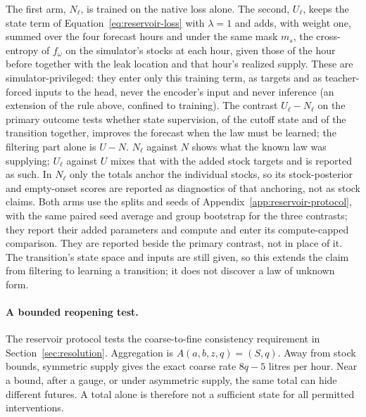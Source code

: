 \documentclass[10pt]{article}
\begin{document}
The first arm, $N_\ell$, is trained on the native loss alone. The second, $U_\ell$,
keeps the state term of Equation~\ref{eq:reservoir-loss} with $\lambda=1$ and adds,
with weight one, summed over the four forecast hours and under the same mask $m_s$,
the cross-entropy of $f_\omega$ on the simulator's stocks at each hour, given those of
the hour before together with the leak location and that hour's realized supply.
These are simulator-privileged: they enter only this training term, as targets and
as teacher-forced inputs to the head, never the encoder's input and never inference
(an extension of the rule above, confined to training).
The contrast $U_\ell-N_\ell$ on the primary outcome tests whether state supervision,
of the cutoff state and of the transition together, improves the forecast when the
law must be learned; the filtering part alone is $U-N$. $N_\ell$ against $N$ shows
what the known law was supplying; $U_\ell$ against $U$ mixes that with the added
stock targets and is reported as such. In $N_\ell$ only the totals anchor the
individual stocks, so its stock-posterior and empty-onset scores are reported as
diagnostics of that anchoring, not as stock claims. Both arms use the splits and
seeds of Appendix~\ref{app:reservoir-protocol}, with the same paired seed average
and group bootstrap for the three contrasts; they report their added parameters and
compute and enter its compute-capped comparison. They are reported beside the
primary contrast, not in place of it. The transition's state space and inputs are
still given, so this extends the claim from filtering to learning a transition; it
does not discover a law of unknown form.

\paragraph{A bounded reopening test.}
The reservoir protocol tests the coarse-to-fine consistency requirement in
Section~\ref{sec:resolution}. Aggregation is
$A(a,b,z,q)=(S,q)$. Away from stock bounds, symmetric supply gives the exact
coarse rate $8q-5$ litres per hour. Near a bound, after a gauge, or under
asymmetric supply, the same total can hide different futures. A total alone
is therefore not a sufficient state for all permitted interventions.
\end{document}
